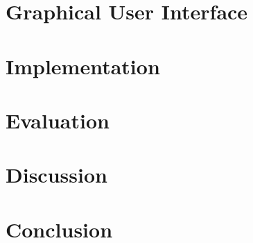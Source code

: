 \documentclass[10pt]{article}
\begin{document}
\section{Graphical User Interface} 

\newpage

\section{Implementation} 

\newpage

\section{Evaluation} 

\newpage

\section{Discussion} 

\newpage

\section{Conclusion} 

\newpage

\nocite{*}
\printbibliography
\end{document}

